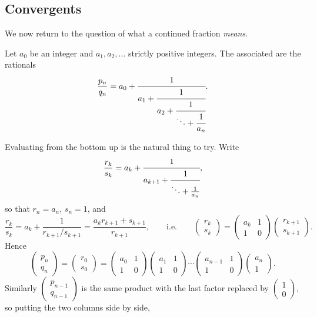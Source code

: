 \documentclass[a4paper]{scrartcl}
\begin{document}
\subsection{Convergents}

We now return to the question of what a continued fraction \emph{means}.

\begin{definition}
	Let $a_0$ be an integer and $a_1,a_2,\ldots$ strictly positive integers. The associated  are the rationals
	$$\frac{p_n}{q_n} = a_0+\cfrac1{a_1+\cfrac1{a_2+\cfrac1{\ddots+\cfrac1{a_n}}}}.$$
\end{definition}

Evaluating from the bottom up is the natural thing to try. Write
$$\frac{r_k}{s_k} = a_k+\cfrac1{a_{k+1}+\cfrac1{\ddots+\frac1{a_n}}},$$
so that $r_n = a_n$, $s_n=1$, and
$$\frac{r_k}{s_k} = a_k + \frac{1}{r_{k+1}/s_{k+1}} = \frac{a_kr_{k+1}+s_{k+1}}{r_{k+1}}, \qquad\text{i.e.}\qquad \begin{pmatrix}r_k\\s_k\end{pmatrix} = \begin{pmatrix}a_k&1\\1&0\end{pmatrix}\begin{pmatrix}r_{k+1}\\s_{k+1}\end{pmatrix}.$$
Hence
$$\begin{pmatrix}p_n\\q_n\end{pmatrix} = \begin{pmatrix}r_0\\s_0\end{pmatrix} = \begin{pmatrix}a_0&1\\1&0\end{pmatrix}\begin{pmatrix}a_1&1\\1&0\end{pmatrix}\cdots\begin{pmatrix}a_{n-1}&1\\1&0\end{pmatrix}\begin{pmatrix}a_n\\1\end{pmatrix}.$$
Similarly $\begin{pmatrix}p_{n-1}\\q_{n-1}\end{pmatrix}$ is the same product with the last factor replaced by $\begin{pmatrix}1\\0\end{pmatrix}$, so putting the two columns side by side,
\end{document}

